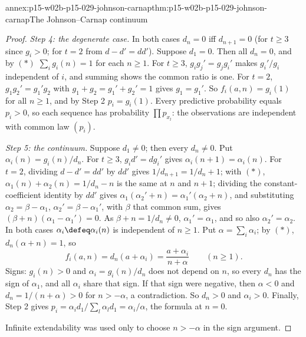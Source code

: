 \begin{annexitem}{annex:p15-w02b-p15-029-johnson-carnap}{thm:p15-w02b-p15-029-johnson-carnap}{The Johnson--Carnap continuum}
\begin{proof}
\emph{Step 4: the degenerate case.} In both cases \(d_n=0\) iff
\(d_{n+1}=0\) (for \(t\geq3\) since \(g_i>0\); for \(t=2\) from
\(d-d'=dd'\)). Suppose \(d_1=0\). Then all \(d_n=0\), and by
\((\ast)\) \(\sum_ig_i(n)=1\) for each \(n\geq1\). For \(t\geq3\),
\(g_ig_j'=g_jg_i'\) makes \(g_i'/g_i\) independent of \(i\), and
summing shows the common ratio is one. For \(t=2\),
\(g_1g_2'=g_1'g_2\) with \(g_1+g_2=g_1'+g_2'=1\) gives
\(g_1=g_1'\). So \(f_i(a,n)=g_i(1)\) for all \(n\geq1\), and by Step
2 \(p_i=g_i(1)\). Every predictive probability equals \(p_i>0\), so
each sequence has probability \(\prod p_{x_l}\): the observations are
independent with common law \((p_i)\).

\emph{Step 5: the continuum.} Suppose \(d_1\ne0\); then every
\(d_n\ne0\). Put \(\alpha_i(n)=g_i(n)/d_n\). For \(t\geq3\),
\(g_id'=dg_i'\) gives \(\alpha_i(n+1)=\alpha_i(n)\). For \(t=2\),
dividing \(d-d'=dd'\) by \(dd'\) gives \(1/d_{n+1}=1/d_n+1\); with
\((\ast)\), \(\alpha_1(n)+\alpha_2(n)=1/d_n-n\) is the same at
\(n\) and \(n+1\); dividing the constant-coefficient identity by
\(dd'\) gives
\(\alpha_1(\alpha_2'+n)=\alpha_1'(\alpha_2+n)\), and substituting
\(\alpha_2=\beta-\alpha_1\), \(\alpha_2'=\beta-\alpha_1'\), with
\(\beta\) that common sum, gives \((\beta+n)(\alpha_1-\alpha_1')=0\).
As \(\beta+n=1/d_n\ne0\), \(\alpha_1'=\alpha_1\), and so also
\(\alpha_2'=\alpha_2\). In both cases \(\alpha_i\defeq\alpha_i(n)\)
is independent of \(n\geq1\). Put \(\alpha=\sum_i\alpha_i\); by
\((\ast)\), \(d_n(\alpha+n)=1\), so
\[
 f_i(a,n)=d_n(a+\alpha_i)=\frac{a+\alpha_i}{n+\alpha}\qquad(n\geq1).
\]
Signs: \(g_i(n)>0\) and \(\alpha_i=g_i(n)/d_n\) does not depend on
\(n\), so every \(d_n\) has the sign of \(\alpha_1\), and all
\(\alpha_i\) share that sign. If that sign were negative, then \(\alpha<0\) and
\(d_n=1/(n+\alpha)>0\) for \(n>-\alpha\), a contradiction. So
\(d_n>0\) and \(\alpha_i>0\). Finally, Step 2 gives
\(p_i=\alpha_id_1/\sum_l\alpha_ld_1=\alpha_i/\alpha\), the formula at
\(n=0\).

Infinite extendability was used only to choose \(n>-\alpha\) in the
sign argument.
\end{proof}
\end{annexitem}

